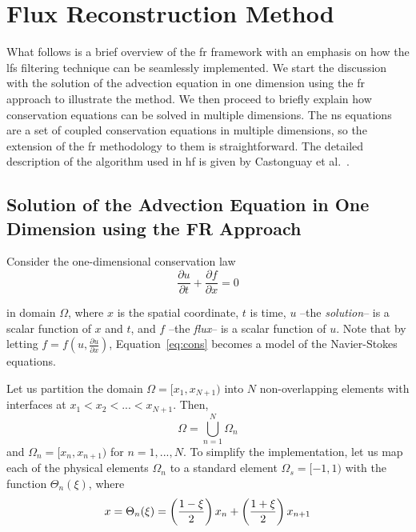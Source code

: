 \section{Flux Reconstruction Method}
\label{sec:frmethod}
What follows is a brief overview of the \gls{fr} framework with an emphasis on how the \gls{lfs} filtering technique can be seamlessly implemented. We start the discussion with the solution of the advection equation in one dimension using the \gls{fr} approach to illustrate the method. We then proceed to briefly explain how conservation equations can be solved in multiple dimensions. The \gls{ns} equations are a set of coupled conservation equations in multiple dimensions, so the extension of the \gls{fr} methodology to them is straightforward. The detailed description of the algorithm used in \gls{hf} is given by Castonguay et al.~\cite{castonguay2011}.

\subsection{Solution of the Advection Equation in One Dimension using the FR Approach}

Consider the one-dimensional conservation law
\begin{equation}
\label{eq:cons}
\frac{\partial u}{\partial t} + \frac{\partial f}{\partial x} = 0
\end{equation}

in domain $\Omega$, where $x$ is the spatial coordinate, $t$ is time, $u$ --the \emph{solution}-- is a scalar function of $x$ and $t$, and $f$ --the \emph{flux}-- is a scalar function of $u$. Note that by letting $f = f(u,\frac{\partial u}{\partial x})$, Equation~\eqref{eq:cons} becomes a model of the Navier-Stokes equations.

Let us partition the domain $\Omega = [x_1,x_{N+1})$ into $N$ non-overlapping elements with 
interfaces at $x_1<x_2<...<x_{N+1}$. Then,
\begin{equation}
\Omega = \bigcup^N_{n=1} \Omega_n
\end{equation}
and $\Omega_n = [x_n,x_{n+1})$ for $n = 1,...,N$. To simplify the implementation, let us map each of the physical elements $\Omega_n$ to a standard element $\Omega_s=[-1,1)$ with the function $\Theta_n(\xi)$, where
\begin{equation}
x = \Theta_n(\xi) = \left( \frac{1-\xi}{2} \right) x_n + \left(\frac{1+\xi}{2}\right) x_{n+1} 
\end{equation}

